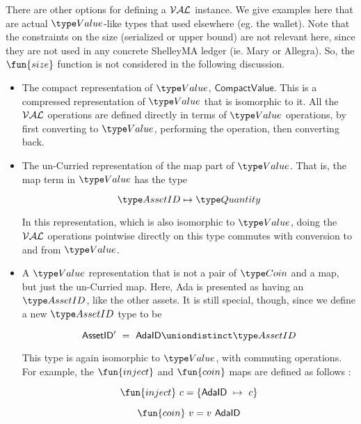 There are other options for defining a $\mathcal{VAL}$ instance. We give examples here
that are actual $\Value$-like types that used elsewhere (eg. the wallet).
Note that the constraints on the size (serialized or upper bound) are not relevant
here, since they are not used in any concrete ShelleyMA ledger (ie. Mary or Allegra).
So, the $\fun{size}$ function is not considered in the following discussion.

\begin{itemize}
  \item The compact representation of $\Value$, $\mathsf{CompactValue}$. This
  is a compressed representation of $\Value$ that is isomorphic to it.
  All the $\mathcal{VAL}$ operations
  are defined directly in terms of $\Value$ operations, by first converting
  to $\Value$, performing the operation, then converting back.

  \item The un-Curried representation of the map part of $\Value$. That is,
  the map term in $\Value$ has the type

  \[ \AssetID \mapsto \Quantity \]

  In this representation, which is also isomorphic to $\Value$, doing the
  $\mathcal{VAL}$ operations pointwise directly on this type commutes with conversion to
  and from $\Value$.

  \item A $\Value$ representation that is not a pair of $\Coin$ and a map, but just
  the un-Curried map. Here, Ada is presented as having an $\AssetID$,
  like the other assets. It is still special, though, since we define a new
  $\AssetID$ type to be

  \[ \mathsf{AssetID'} ~=~ \mathsf{AdaID} \uniondistinct \AssetID \]

  This type is again isomorphic to $\Value$, with commuting operations. For
  example, the $\fun{inject}$ and $\fun{coin}$ maps are defined as follows :

  \[ \fun{inject}~c = \{ \mathsf{AdaID}~\mapsto~c \} \]

  \[ \fun{coin}~v = v~\mathsf{AdaID} \]
\end{itemize}
